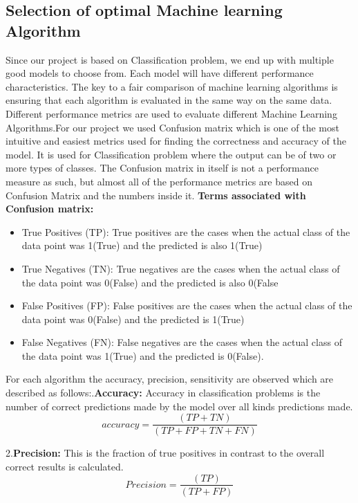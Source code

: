 \subsection{Selection of optimal Machine learning Algorithm}
Since our project is based on Classification problem, we end up with multiple good models to choose from. Each model will have different performance characteristics. The key to a fair comparison of machine learning algorithms is ensuring that each algorithm is evaluated in the same way on the same data.
Different performance metrics are used to evaluate different Machine Learning Algorithms.\newline For our project we used Confusion matrix which is  one of the most intuitive and easiest metrics used for finding the correctness and accuracy of the model. It is used for Classification problem where the output can be of two or more types of classes. The Confusion matrix in itself is not a performance measure as such, but almost all of the performance metrics are based on Confusion Matrix and the numbers inside it.\newline
\textbf{Terms associated with Confusion matrix:}
\begin{itemize}
    \item True Positives (TP): True positives are the cases when the actual class of the data point was 1(True) and the predicted is also 1(True)
    \item True Negatives (TN): True negatives are the cases when the actual class of the data point was 0(False) and the predicted is also 0(False 
    \item  False Positives (FP): False positives are the cases when the actual class of the data point was 0(False) and the predicted is 1(True)
    \item False Negatives (FN): False negatives are the cases when the actual class of the data point was 1(True) and the predicted is 0(False).
\end{itemize}

For  each  algorithm  the  accuracy, precision, sensitivity are observed which are described as follows:.\textbf{Accuracy:} Accuracy in classification problems is the number of correct predictions made by the model over all kinds predictions made.
\[ accuracy=  \frac{(TP+TN)}{(TP+FP+TN+FN)} \]
 
2.\textbf{Precision:} This is the fraction of true positives in contrast to the overall correct results is calculated.
\[ Precision=  \frac{(TP)}{(TP+FP)} \]
 
